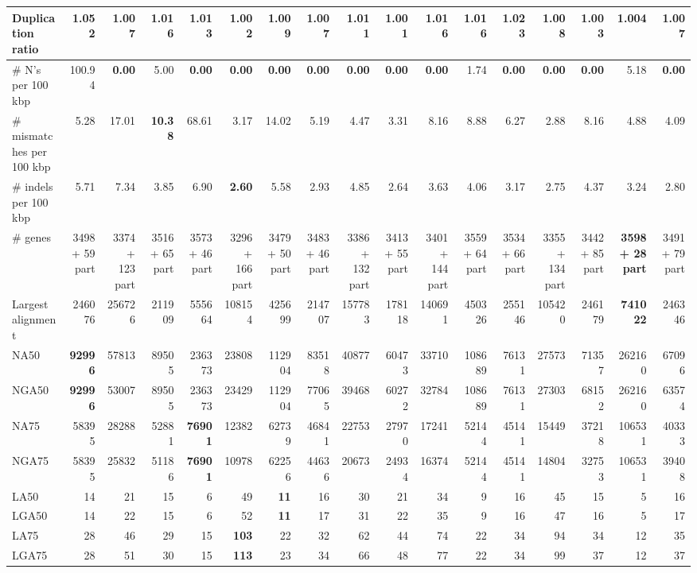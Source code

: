 \documentclass[12pt,a4paper]{article}
\begin{document}
\begin{table}[ht]
\begin{center}
\begin{tabular}{|l*{16}{|r}|}
Duplication ratio & 1.052 & 1.007 & 1.016 & 1.013 & 1.002 & 1.009 & 1.007 & 1.011 & {\bf 1.001} & 1.016 & 1.016 & 1.023 & 1.008 & 1.003 & 1.004 & 1.007 \\ \hline
\# N's per 100 kbp & 100.94 & {\bf 0.00} & 5.00 & {\bf 0.00} & {\bf 0.00} & {\bf 0.00} & {\bf 0.00} & {\bf 0.00} & {\bf 0.00} & {\bf 0.00} & 1.74 & {\bf 0.00} & {\bf 0.00} & {\bf 0.00} & 5.18 & {\bf 0.00} \\ \hline
\# mismatches per 100 kbp & 5.28 & 17.01 & {\bf 10.38} & 68.61 & 3.17 & 14.02 & 5.19 & 4.47 & 3.31 & 8.16 & 8.88 & 6.27 & 2.88 & 8.16 & 4.88 & 4.09 \\ \hline
\# indels per 100 kbp & 5.71 & 7.34 & 3.85 & 6.90 & {\bf 2.60} & 5.58 & 2.93 & 4.85 & 2.64 & 3.63 & 4.06 & 3.17 & 2.75 & 4.37 & 3.24 & 2.80 \\ \hline
\# genes & 3498 + 59 part & 3374 + 123 part & 3516 + 65 part & 3573 + 46 part & 3296 + 166 part & 3479 + 50 part & 3483 + 46 part & 3386 + 132 part & 3413 + 55 part & 3401 + 144 part & 3559 + 64 part & 3534 + 66 part & 3355 + 134 part & 3442 + 85 part & {\bf 3598 + 28 part} & 3491 + 79 part \\ \hline
Largest alignment & 246076 & 256726 & 211909 & 555664 & 108154 & 425699 & 214707 & 157783 & 178118 & 140691 & 450326 & 255146 & 105420 & 246179 & {\bf 741022} & 246346 \\ \hline
NA50 & {\bf 92996} & 57813 & 89505 & 236373 & 23808 & 112904 & 83518 & 40877 & 60473 & 33710 & 108689 & 76131 & 27573 & 71357 & 262160 & 67096 \\ \hline
NGA50 & {\bf 92996} & 53007 & 89505 & 236373 & 23429 & 112904 & 77065 & 39468 & 60272 & 32784 & 108689 & 76131 & 27303 & 68152 & 262160 & 63574 \\ \hline
NA75 & 58395 & 28288 & 52881 & {\bf 76901} & 12382 & 62739 & 46841 & 22753 & 27970 & 17241 & 52144 & 45141 & 15449 & 37218 & 106531 & 40333 \\ \hline
NGA75 & 58395 & 25832 & 51186 & {\bf 76901} & 10978 & 62256 & 44636 & 20673 & 24934 & 16374 & 52144 & 45141 & 14804 & 32753 & 106531 & 39408 \\ \hline
LA50 & 14 & 21 & 15 & 6 & 49 & {\bf 11} & 16 & 30 & 21 & 34 & 9 & 16 & 45 & 15 & 5 & 16 \\ \hline
LGA50 & 14 & 22 & 15 & 6 & 52 & {\bf 11} & 17 & 31 & 22 & 35 & 9 & 16 & 47 & 16 & 5 & 17 \\ \hline
LA75 & 28 & 46 & 29 & 15 & {\bf 103} & 22 & 32 & 62 & 44 & 74 & 22 & 34 & 94 & 34 & 12 & 35 \\ \hline
LGA75 & 28 & 51 & 30 & 15 & {\bf 113} & 23 & 34 & 66 & 48 & 77 & 22 & 34 & 99 & 37 & 12 & 37 \\ \hline
\end{tabular}
\end{center}
\end{table}
\end{document}
